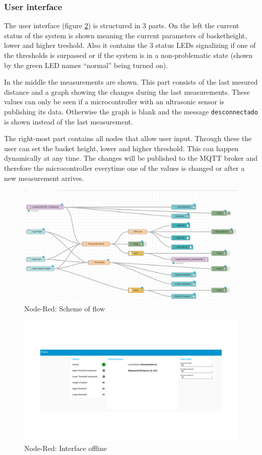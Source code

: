 \documentclass{article}
\begin{document}
\subsubsection{User interface}
The user interface (figure \ref{inteface_offline}) is structured in 3 parts. On the left the current status of the system is shown meaning the current parameters of basketheight, lower and higher treshold. Also it contains the 3 status LEDs signalizing if one of the thresholds is surpassed or if the system is in a non-problematic state (shown by the green LED names \enquote{normal} being turned on).\par 
In the middle the measurements are shown. This part consists of the last mesured distance and a graph showing the changes during the last measurements. These values can only be seen if a microcontroller with an ultrasonic sensor is publishing its data. Otherwise the graph is blank and the message \verb|desconnectado| is shown instead of the last measurement.\par 
The right-most part contains all nodes that allow user input. Through these the user can set the basket height, lower and higher threshold. This can happen dynamically at any time. The changes will be published to the MQTT broker and therefore the microcontroller everytime one of the values is changed or after a new measurement arrives.
\begin{figure}
	\centering
	\includegraphics[scale=1.2]{images/flowScheme.png}
	\caption{Node-Red: Scheme of flow}	
	\label{flowScheme}
\end{figure}

\begin{figure}
	\centering
	\includegraphics[scale=0.25]{images/interface_offline_2.png}
	\caption{Node-Red: Interface offline}	
	\label{inteface_offline}
\end{figure}
\end{document}
